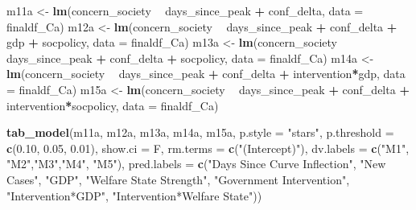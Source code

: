 \documentclass[
]{article}
\newenvironment{Shaded}{\begin{snugshade}}{\end{snugshade}}
\newcommand{\DataTypeTok}[1]{\textcolor[rgb]{0.13,0.29,0.53}{#1}}
\newcommand{\FloatTok}[1]{\textcolor[rgb]{0.00,0.00,0.81}{#1}}
\newcommand{\KeywordTok}[1]{\textcolor[rgb]{0.13,0.29,0.53}{\textbf{#1}}}
\newcommand{\NormalTok}[1]{#1}
\newcommand{\OperatorTok}[1]{\textcolor[rgb]{0.81,0.36,0.00}{\textbf{#1}}}
\newcommand{\StringTok}[1]{\textcolor[rgb]{0.31,0.60,0.02}{#1}}
\begin{document}
\begin{Shaded}
\begin{Highlighting}[]
\NormalTok{m11a <-}\StringTok{ }\KeywordTok{lm}\NormalTok{(concern_society }\OperatorTok{~}\StringTok{ }\NormalTok{days_since_peak }\OperatorTok{+}\StringTok{ }\NormalTok{conf_delta, }\DataTypeTok{data =}\NormalTok{ finaldf_Ca)}
\NormalTok{m12a <-}\StringTok{ }\KeywordTok{lm}\NormalTok{(concern_society }\OperatorTok{~}\StringTok{ }\NormalTok{days_since_peak }\OperatorTok{+}\StringTok{ }\NormalTok{conf_delta }\OperatorTok{+}\StringTok{ }\NormalTok{gdp }\OperatorTok{+}\StringTok{ }\NormalTok{socpolicy, }\DataTypeTok{data =}\NormalTok{ finaldf_Ca)}
\NormalTok{m13a <-}\StringTok{ }\KeywordTok{lm}\NormalTok{(concern_society }\OperatorTok{~}\StringTok{ }\NormalTok{days_since_peak }\OperatorTok{+}\StringTok{ }\NormalTok{conf_delta }\OperatorTok{+}\StringTok{ }\NormalTok{socpolicy, }\DataTypeTok{data =}\NormalTok{ finaldf_Ca)}
\NormalTok{m14a <-}\StringTok{ }\KeywordTok{lm}\NormalTok{(concern_society }\OperatorTok{~}\StringTok{ }\NormalTok{days_since_peak }\OperatorTok{+}\StringTok{ }\NormalTok{conf_delta }\OperatorTok{+}\StringTok{ }\NormalTok{intervention}\OperatorTok{*}\NormalTok{gdp, }\DataTypeTok{data =}\NormalTok{ finaldf_Ca)}
\NormalTok{m15a <-}\StringTok{ }\KeywordTok{lm}\NormalTok{(concern_society }\OperatorTok{~}\StringTok{ }\NormalTok{days_since_peak }\OperatorTok{+}\StringTok{ }\NormalTok{conf_delta }\OperatorTok{+}\StringTok{ }\NormalTok{intervention}\OperatorTok{*}\NormalTok{socpolicy, }\DataTypeTok{data =}\NormalTok{ finaldf_Ca)}

\KeywordTok{tab_model}\NormalTok{(m11a, m12a, m13a, m14a, m15a, }\DataTypeTok{p.style =} \StringTok{"stars"}\NormalTok{, }\DataTypeTok{p.threshold =} \KeywordTok{c}\NormalTok{(}\FloatTok{0.10}\NormalTok{, }\FloatTok{0.05}\NormalTok{, }\FloatTok{0.01}\NormalTok{), }\DataTypeTok{show.ci =}\NormalTok{ F, }\DataTypeTok{rm.terms =} \KeywordTok{c}\NormalTok{(}\StringTok{"(Intercept)"}\NormalTok{),  }\DataTypeTok{dv.labels =} \KeywordTok{c}\NormalTok{(}\StringTok{"M1"}\NormalTok{, }\StringTok{"M2"}\NormalTok{,}\StringTok{"M3"}\NormalTok{,}\StringTok{"M4"}\NormalTok{, }\StringTok{"M5"}\NormalTok{), }\DataTypeTok{pred.labels =} \KeywordTok{c}\NormalTok{(}\StringTok{"Days Since Curve Inflection"}\NormalTok{, }\StringTok{"New Cases"}\NormalTok{,  }\StringTok{"GDP"}\NormalTok{, }\StringTok{"Welfare State Strength"}\NormalTok{, }\StringTok{"Government Intervention"}\NormalTok{, }\StringTok{"Intervention*GDP"}\NormalTok{, }\StringTok{"Intervention*Welfare State"}\NormalTok{))}
\end{Highlighting}
\end{Shaded}
\end{document}
